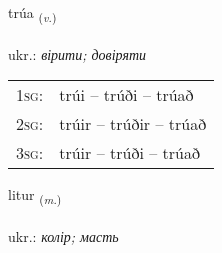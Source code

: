 \documentclass[frontgrid, backgrid]{flacards}\usepackage[]{graphicx}\usepackage[]{xcolor}
\begin{document}
\renewcommand{\flhead}{\vskip5pt \fboxsep=0pt {\small\bfseries\footnotesize Sagnorð | дієслово}}
\renewcommand{\fcfoot}{\vskip5pt \fboxsep=0pt \hspace{2pt}{\small\bfseries\footnotesize 1K}}

\renewcommand{\blhead}{\vskip5pt {\small\bfseries\footnotesize Sagnorð | дієслово }}
\renewcommand{\bcfoot}{\vskip5pt \hspace{2pt}{\small\bfseries\footnotesize 1K}}


{trúa \small{\textsubscript{(\textit{v.})}} \\[1ex] %
\textphonetic{[tʰruːa]} \\
ukr.: \emph{вірити; довіряти} \\  [2ex]
\renewcommand*{\arraystretch}{0.8}
\begin{tabular}{p{1cm}l}
\textsc{1sg}: & trúi -- trúði -- trúað \\ 
\textsc{2sg}: & trúir -- trúðir -- trúað \\ 
\textsc{3sg}: & trúir -- trúði -- trúað \\ 
\end{tabular}
}

\renewcommand{\flhead}{\vskip5pt \fboxsep=0pt {\small\bfseries\footnotesize Nafnorð | іменник}}
\renewcommand{\fcfoot}{\vskip5pt \fboxsep=0pt \hspace{2pt}{\small\bfseries\footnotesize 1K}}

\renewcommand{\blhead}{\vskip5pt {\small\bfseries\footnotesize Nafnorð | іменник }}
\renewcommand{\bcfoot}{\vskip5pt \hspace{2pt}{\small\bfseries\footnotesize 1K}}


{litur \small{\textsubscript{(\textit{m.})}} \\[1ex] %
\textphonetic{[lɪːtʏr]} \\
ukr.: \emph{колір; масть} \\  [2ex]
\renewcommand*{\arraystretch}{0.8}
}
\end{document}
